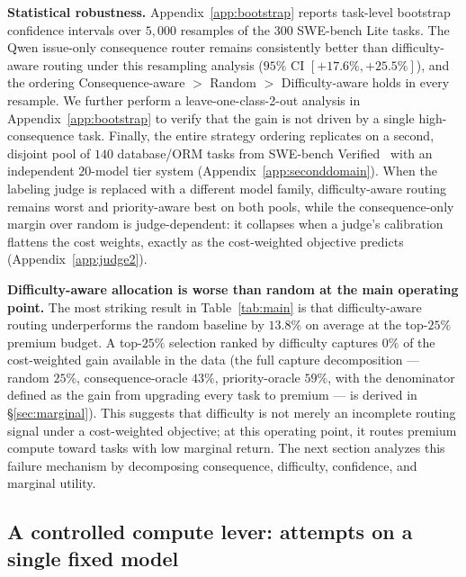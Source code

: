\documentclass{article}
\begin{document}
\textbf{Statistical robustness.} Appendix~\ref{app:bootstrap} reports
task-level bootstrap confidence intervals over $5{,}000$ resamples of
the $300$ SWE-bench Lite tasks. The Qwen issue-only consequence router
remains consistently better than difficulty-aware routing under this
resampling analysis ($95\%$ CI $[+17.6\%, +25.5\%]$), and the ordering
Consequence-aware $>$ Random $>$ Difficulty-aware holds in every
resample. We further perform a leave-one-class-2-out analysis in
Appendix~\ref{app:bootstrap} to verify that the gain is not driven by
a single high-consequence task. Finally, the entire strategy ordering
replicates on a second, disjoint pool of $140$ database/ORM tasks
from SWE-bench Verified~\citep{openai2024swebenchverified} with an
independent $20$-model tier system (Appendix~\ref{app:seconddomain}). When the labeling judge is
replaced with a different model family, difficulty-aware routing
remains worst and priority-aware best on both pools, while the
consequence-only margin over random is judge-dependent: it collapses
when a judge's calibration flattens the cost weights, exactly as the
cost-weighted objective predicts (Appendix~\ref{app:judge2}).

\textbf{Difficulty-aware allocation is worse than random at the main
operating point.} The most striking result in Table~\ref{tab:main} is
that difficulty-aware routing underperforms the random baseline by
$13.8\%$ on average at the top-$25\%$ premium budget. A top-$25\%$ selection
ranked by difficulty captures $0\%$ of the cost-weighted gain
available in the data (the full capture decomposition --- random
$25\%$, consequence-oracle $43\%$, priority-oracle $59\%$, with the
denominator defined as the gain from upgrading every task to premium
--- is derived in \S\ref{sec:marginal}). This suggests that difficulty is not merely
an incomplete routing signal under a cost-weighted objective; at this
operating point, it routes premium compute toward tasks with low
marginal return. The next section analyzes this failure mechanism by
decomposing consequence, difficulty, confidence, and marginal utility.

\subsection{A controlled compute lever: attempts on a single fixed model}
\label{sec:withinmain}
\end{document}
